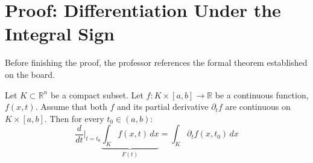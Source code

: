 \section{Proof: Differentiation Under the Integral Sign}

\begin{nice-box}
Before finishing the proof, the professor references the formal theorem established on the board.
\end{nice-box}

\begin{orange-formula}
\begin{theorem}
Let $K \subset \mathbb{R}^n$ be a compact subset. Let $f: K \times [a,b] \to \mathbb{R}$ be a continuous function, $f(x,t)$. 
Assume that both $f$ and its partial derivative $\partial_t f$ are continuous on $K \times [a,b]$.
Then for every $t_0 \in (a,b)$:
\[
\frac{d}{dt} \bigg|_{t=t_0} \underbrace{\int_K f(x,t) \, dx}_{F(t)} = \int_K \partial_t f(x,t_0) \, dx
\]
\end{theorem}
\end{orange-formula}

